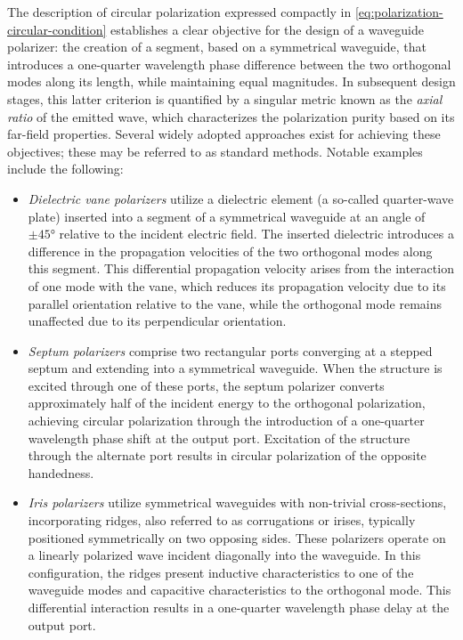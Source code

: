 \documentclass[11pt,a4paper,twoside,openany]{report}
\begin{document}
The description of circular polarization expressed compactly in \cref{eq:polarization-circular-condition} establishes a clear objective for the design of a waveguide polarizer: the creation of a segment, based on a symmetrical waveguide, that introduces a one-quarter wavelength phase difference between the two orthogonal modes along its length, while maintaining equal magnitudes. In subsequent design stages, this latter criterion is quantified by a singular metric known as the \emph{axial ratio} of the emitted wave, which characterizes the polarization purity based on its far-field properties. Several widely adopted approaches exist for achieving these objectives; these may be referred to as standard methods. Notable examples include the following:
\begin{itemize}
    \item \emph{Dielectric vane polarizers} utilize a dielectric element (a so-called quarter-wave plate) inserted into a segment of a symmetrical waveguide at an angle of $\pm \ang{45}$ relative to the incident electric field. The inserted dielectric introduces a difference in the propagation velocities of the two orthogonal modes along this segment. This differential propagation velocity arises from the interaction of one mode with the vane, which reduces its propagation velocity due to its parallel orientation relative to the vane, while the orthogonal mode remains unaffected due to its perpendicular orientation.

    \item \emph{Septum polarizers} comprise two rectangular ports converging at a stepped septum and extending into a symmetrical waveguide. When the structure is excited through one of these ports, the septum polarizer converts approximately half of the incident energy to the orthogonal polarization, achieving circular polarization through the introduction of a one-quarter wavelength phase shift at the output port. Excitation of the structure through the alternate port results in circular polarization of the opposite handedness.

    \item \emph{Iris polarizers} utilize symmetrical waveguides with non-trivial cross-sections, incorporating ridges, also referred to as corrugations or irises, typically positioned symmetrically on two opposing sides. These polarizers operate on a linearly polarized wave incident diagonally into the waveguide. In this configuration, the ridges present inductive characteristics to one of the waveguide modes and capacitive characteristics to the orthogonal mode. This differential interaction results in a one-quarter wavelength phase delay at the output port.
\end{itemize}
\end{document}
